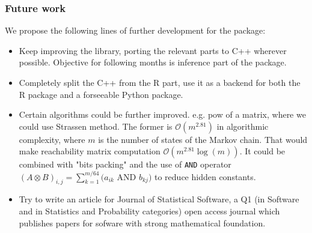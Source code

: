 \begin{frame}\frametitle{Future work}
 \vspace{2em}\fontsize{10pt}{0}\selectfont
 We propose the following lines of further development for the package:
 \begin{itemize}
 \item Keep improving the library, porting the relevant parts to C++ wherever
 possible. Objective for following months is inference part of the package.
 \item Completely split the C++ from the R part, use it as a backend for both the R 
 package and a forseeable Python package.
 \item Certain algorithms could be further improved. e.g. pow of a matrix, where we 
 could use Strassen method. The former is $\mathcal{O}(m^{2.81})$ in algorithmic 
 complexity, where $m$ is the number of states of the Markov chain. That would make 
 reachability matrix computation $\mathcal{O}(m^{2.81} \log(m))$. It could be combined 
 with "bits packing" and the use of \texttt{AND} operator
 $(A \otimes B)_{i,j} = \sum_{k = 1}^{m/64} \bigg(a_{ik} \textrm{ AND } b_{kj}\bigg)$
 to reduce hidden constants.
 \item Try to write an article for Journal of Statistical Software, a Q1 (in Software 
 and in Statistics and Probability categories) open access journal which publishes papers
 for sofware with strong mathematical foundation.
 \end{itemize}
\end{frame}
